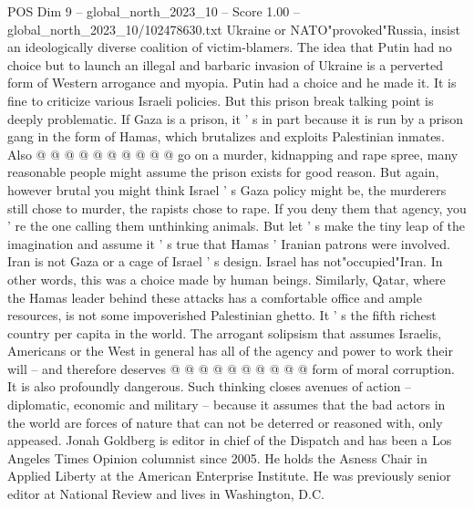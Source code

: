 \begin{textsample}{POS Dim 9 – global\_north\_2023\_10 – Score 1.00 – global\_north\_2023\_10/102478630.txt}
Ukraine or NATO"provoked"Russia, insist an ideologically diverse coalition of victim-blamers.
The idea that Putin had no choice but to launch an illegal and barbaric invasion of Ukraine is a perverted form of Western arrogance and myopia.
Putin had a choice and he made it.
It is fine to criticize various Israeli policies.
But this prison break talking point is deeply problematic.
If Gaza is a prison, it ' s in part because it is run by a prison gang in the form of Hamas, which brutalizes and exploits Palestinian inmates.
Also @ @ @ @ @ @ @ @ @ @ go on a murder, kidnapping and rape spree, many reasonable people might assume the prison exists for good reason.
But again, however brutal you might think Israel ' s Gaza policy might be, the murderers still chose to murder, the rapists chose to rape.
If you deny them that agency, you ' re the one calling them unthinking animals.
But let ' s make the tiny leap of the imagination and assume it ' s true that Hamas ' Iranian patrons were involved.
Iran is not Gaza or a cage of Israel ' s design.
Israel has not"occupied"Iran.
In other words, this was a choice made by human beings.
Similarly, Qatar, where the Hamas leader behind these attacks has a comfortable office and ample resources, is not some impoverished Palestinian ghetto.
It ' s the fifth richest country per capita in the world.
The arrogant solipsism that assumes Israelis, Americans or the West in general has all of the agency and power to work their will -- and therefore deserves @ @ @ @ @ @ @ @ @ @ form of moral corruption.
It is also profoundly dangerous.
Such thinking closes avenues of action -- diplomatic, economic and military -- because it assumes that the bad actors in the world are forces of nature that can not be deterred or reasoned with, only appeased.
Jonah Goldberg is editor in chief of the Dispatch and has been a Los Angeles Times Opinion columnist since 2005.
He holds the Asness Chair in Applied Liberty at the American Enterprise Institute.
He was previously senior editor at National Review and lives in Washington, D.C.

\end{textsample}
